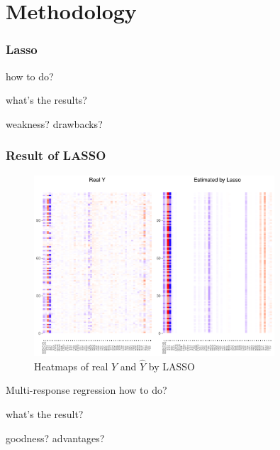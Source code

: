 \section{Methodology}
\begin{frame}
    \sectionpage
\end{frame}

\begin{frame}
    \frametitle{Lasso}

    how to do?

    what's the results?

    weakness? drawbacks?
\end{frame}

\begin{frame}
    \frametitle{Result of LASSO}

    \begin{figure}[h]
        \centering
        \includegraphics[width=0.8\textwidth]{./figs/lasso.pdf}
        \caption{Heatmaps of real $Y$ and $\hat{Y}$ by LASSO}
    \end{figure}    

\end{frame}

\begin{frame}{Multi-response regression}
    how to do? 

    what's the result?

    goodness? advantages?
    
\end{frame}

